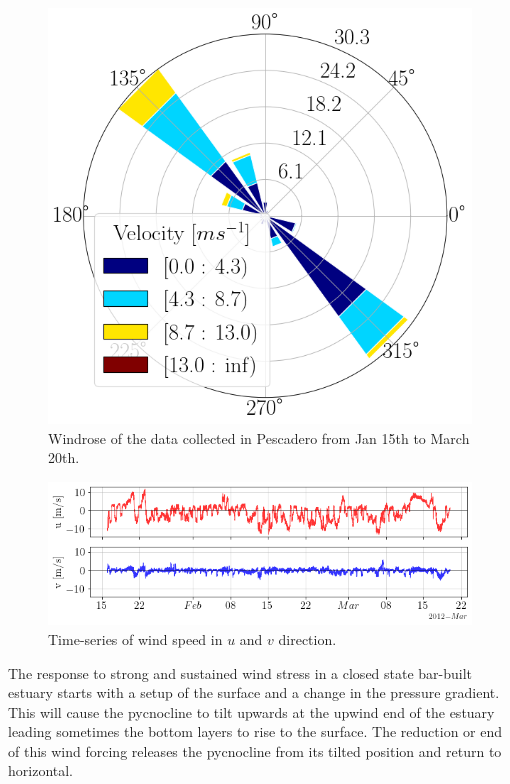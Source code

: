 \documentclass[tesis.tex]{subfiles}
\begin{document}
\begin{figure}[h!]
    \centering
    \includegraphics[scale=0.3]{Imagenes/windrose.png}
    \caption{Windrose of the data collected in Pescadero from Jan 15th to March 20th.}
    \label{fig:windrose}
\end{figure}

\begin{figure}[h!]
    \centering
    \includegraphics[width=\textwidth]{Imagenes/wind_vel.png}
    \caption{Time-series of wind speed in $u$ and $v$ direction.}
    \label{fig:windvel}
\end{figure}

The response to strong and sustained wind stress in a closed state bar-built estuary starts with a setup of the surface and a change in the pressure gradient. This will cause the pycnocline to tilt upwards at the upwind end of the estuary leading sometimes the bottom layers to rise to the surface. The reduction or end of this wind forcing releases the pycnocline from its tilted position and return to horizontal. \\
\end{document}
